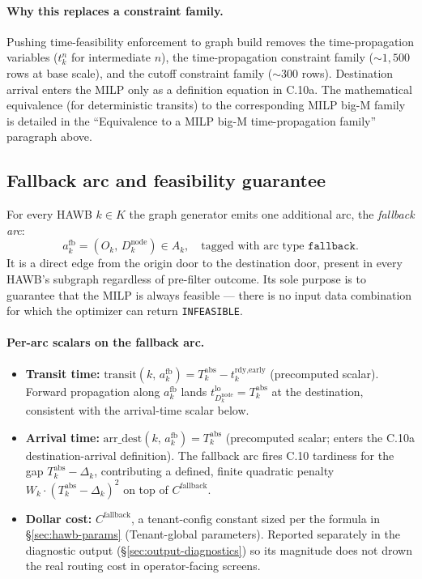 \documentclass[11pt,a4paper]{article}
\theoremstyle{definition}
\begin{document}
\paragraph{Why this replaces a constraint family.}
Pushing time-feasibility enforcement to graph build removes the
time-propagation variables ($t_k^n$ for intermediate $n$), the
time-propagation constraint family ($\sim 1{,}500$ rows at base scale), and
the cutoff constraint family ($\sim 300$ rows). Destination arrival enters
the MILP only as a definition equation in C.10a. The mathematical
equivalence (for deterministic transits) to the corresponding MILP big-M
family is detailed in the ``Equivalence to a MILP big-M time-propagation
family'' paragraph above.

\subsection{Fallback arc and feasibility guarantee}
\label{sec:fallback-arc}

For every HAWB $k \in K$ the graph generator emits one additional arc, the
\emph{fallback arc}:
\begin{equation*}
  a^{\text{fb}}_k = (O_k,\, D_k^{\text{node}}) \in A_k,
  \quad \text{tagged with arc type } \texttt{fallback}.
\end{equation*}
It is a direct edge from the origin door to the destination door, present in
every HAWB's subgraph regardless of pre-filter outcome. Its sole purpose is to
guarantee that the MILP is always feasible --- there is no input data
combination for which the optimizer can return \texttt{INFEASIBLE}.

\paragraph{Per-arc scalars on the fallback arc.}
\begin{itemize}[noitemsep]
  \item \textbf{Transit time:} $\text{transit}(k,\, a^{\text{fb}}_k) =
        T_k^{\text{abs}} - t_k^{\text{rdy,early}}$ (precomputed scalar).
        Forward propagation along $a^{\text{fb}}_k$ lands
        $t^{\text{lo}}_{D_k^{\text{node}}} = T_k^{\text{abs}}$ at the
        destination, consistent with the arrival-time scalar below.
  \item \textbf{Arrival time:} $\text{arr\_dest}(k,\, a^{\text{fb}}_k) =
        T_k^{\text{abs}}$ (precomputed scalar; enters the C.10a destination-arrival
        definition). The fallback arc fires C.10 tardiness for the gap
        $T_k^{\text{abs}} - \Delta_k$, contributing a defined, finite quadratic
        penalty $W_k \cdot (T_k^{\text{abs}} - \Delta_k)^2$ on top of
        $C^{\text{fallback}}$.
  \item \textbf{Dollar cost:} $C^{\text{fallback}}$, a tenant-config
        constant sized per the formula in \S\ref{sec:hawb-params}
        (Tenant-global parameters). Reported separately in the diagnostic
        output (\S\ref{sec:output-diagnostics}) so its magnitude does not
        drown the real routing cost in operator-facing screens.
\end{itemize}
\end{document}
